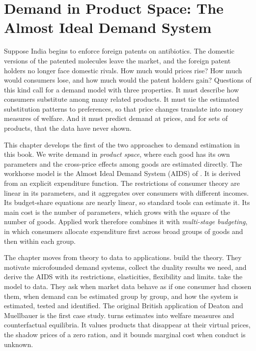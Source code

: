 \chapter{Demand in Product Space: The Almost Ideal Demand System}\label{ch:aids}

Suppose India begins to enforce foreign patents on antibiotics. The domestic versions of the patented molecules
leave the market, and the foreign patent holders no longer face domestic rivals. How much would prices rise? How
much would consumers lose, and how much would the patent holders gain? Questions of this kind call for a demand
model with three properties. It must describe how consumers substitute among many related products. It must tie
the estimated substitution patterns to preferences, so that price changes translate into money measures of
welfare. And it must predict demand at prices, and for sets of products, that the data have never shown.

This chapter develops the first of the two approaches to demand estimation in this book. We write demand in
\emph{product space}, where each good has its own parameters and the cross-price effects among goods are
estimated directly. The workhorse model is the Almost Ideal Demand System (AIDS) of
\citet{DeatonMuellbauer1980a}. It is derived from an explicit expenditure function. The restrictions of consumer
theory are linear in its parameters, and it aggregates over consumers with different incomes. Its budget-share
equations are nearly linear, so standard tools can estimate it. Its main cost is the number of parameters, which
grows with the square of the number of goods. Applied work therefore combines it with \emph{multi-stage
budgeting}, in which consumers allocate expenditure first across broad groups of goods and then within each
group.

The chapter moves from theory to data to applications. 
build the theory. They motivate microfounded demand systems, collect the duality results we need, and derive the
AIDS with its restrictions, elasticities, flexibility and limits.  take the model to data. They ask when market data behave as if one consumer had chosen them,
when demand can be estimated group by group, and how the system is estimated, tested and identified. The original
British application of Deaton and Muellbauer is the first case study.  turns estimates into
welfare measures and counterfactual equilibria. It values products that disappear at their virtual prices, the
shadow prices of a zero ration, and it bounds marginal cost when conduct is unknown.

